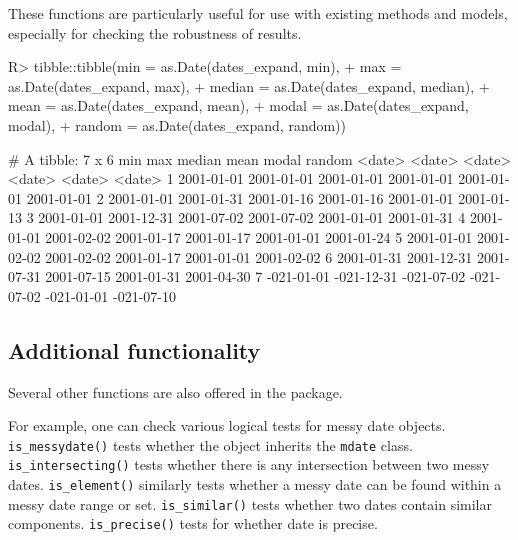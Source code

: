 \documentclass[
]{jss}
\begin{document}
These functions are particularly useful for use with existing methods
and models, especially for checking the robustness of results.

\begin{CodeChunk}
\begin{CodeInput}
R> tibble::tibble(min = as.Date(dates_expand, min),
+                max = as.Date(dates_expand, max),
+                median = as.Date(dates_expand, median),
+                mean = as.Date(dates_expand, mean),
+                modal = as.Date(dates_expand, modal),
+                random = as.Date(dates_expand, random))
\end{CodeInput}
\begin{CodeOutput}
# A tibble: 7 x 6
  min        max        median     mean       modal      random    
  <date>     <date>     <date>     <date>     <date>     <date>    
1 2001-01-01 2001-01-01 2001-01-01 2001-01-01 2001-01-01 2001-01-01
2 2001-01-01 2001-01-31 2001-01-16 2001-01-16 2001-01-01 2001-01-13
3 2001-01-01 2001-12-31 2001-07-02 2001-07-02 2001-01-01 2001-01-31
4 2001-01-01 2001-02-02 2001-01-17 2001-01-17 2001-01-01 2001-01-24
5 2001-01-01 2001-02-02 2001-02-02 2001-01-17 2001-01-01 2001-02-02
6 2001-01-31 2001-12-31 2001-07-31 2001-07-15 2001-01-31 2001-04-30
7 -021-01-01 -021-12-31 -021-07-02 -021-07-02 -021-01-01 -021-07-10
\end{CodeOutput}
\end{CodeChunk}

\hypertarget{additional-functionality}{%
\subsection{Additional functionality}\label{additional-functionality}}

Several other functions are also offered in the 
package.

For example, one can check various logical tests for messy date objects.
\texttt{is\_messydate()} tests whether the object inherits the
\texttt{mdate} class. \texttt{is\_intersecting()} tests whether there is
any intersection between two messy dates. \texttt{is\_element()}
similarly tests whether a messy date can be found within a messy date
range or set. \texttt{is\_similar()} tests whether two dates contain
similar components. \texttt{is\_precise()} tests for whether date is
precise.
\end{document}

